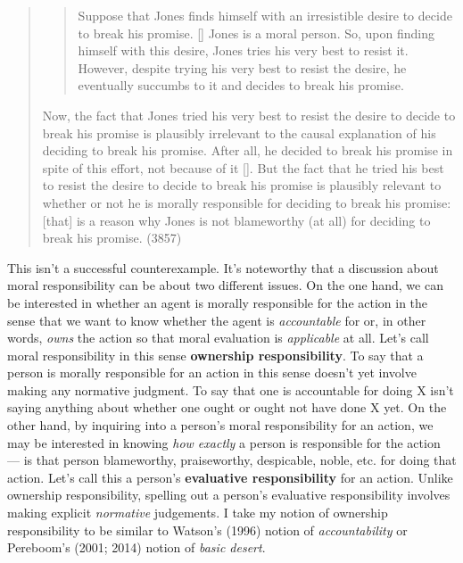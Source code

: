 \documentclass[a4paper,12pt]{article}
\begin{document}
\begin{quote}
\begin{quote}
Suppose that Jones finds himself with an irresistible desire to decide to break his promise. [\textellipsis] Jones is a moral person. So, upon finding himself with this desire, Jones tries his very best to resist it. However, despite trying his very best to resist the desire, he eventually succumbs to it and decides to break his promise.
\end{quote}
Now, the fact that Jones tried his very best to resist the desire to decide to break his promise is plausibly irrelevant to the causal explanation of his deciding to break his promise. After all, he decided to break his promise in spite of this effort, not because of it [\textellipsis]. But the fact that he tried his best to resist the desire to decide to break his promise is plausibly relevant to whether or not he is morally responsible for deciding to break his promise: [that] is a reason why Jones is not blameworthy (at all) for deciding to break his promise.  (3857)
\end{quote}

This isn't a successful counterexample. It's noteworthy that a discussion about moral responsibility can be about two different issues. On the one hand, we can be interested in whether an agent is morally responsible for the action in the sense that we want to know whether the agent is \emph{accountable} for or, in other words, \emph{owns} the action so that moral evaluation is \emph{applicable} at all. Let's call moral responsibility in this sense \textbf{ownership responsibility}. To say that a person is morally responsible for an action in this sense doesn't yet involve making any normative judgment. To say that one is accountable for doing X isn't saying anything about whether one ought or ought not have done X yet. On the other hand, by inquiring into a person's moral responsibility for an action, we may be interested in knowing \emph{how exactly} a person is responsible for the action --- is that person blameworthy, praiseworthy, despicable, noble, etc. for doing that action. Let's call this a person's \textbf{evaluative responsibility} for an action. Unlike ownership responsibility, spelling out a person's evaluative responsibility involves making explicit \emph{normative} judgements. I take my notion of ownership responsibility to be similar to Watson's (1996) notion of \emph{accountability} or Pereboom's (2001; 2014) notion of \emph{basic desert}.\footnotemark
\end{document}
